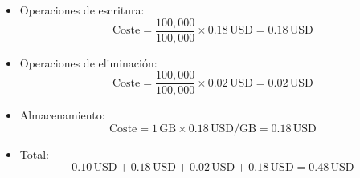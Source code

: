 \begin{enumerate}
\begin{enumerate}
\begin{itemize}
\begin{itemize}
							\item Operaciones de escritura:
								\[
									\text{Coste}= \frac{100,000}{100,000}\times 0.18 \, \text{USD}=
									0.18 \, \text{USD}
								\]

							\item Operaciones de eliminación:
								\[
									\text{Coste}= \frac{100,000}{100,000}\times 0.02 \, \text{USD}=
									0.02 \, \text{USD}
								\]

							\item Almacenamiento:
								\[
									\text{Coste}= 1 \, \text{GB}\times 0.18 \, \text{USD/GB}= 0.18
									\, \text{USD}
								\]

							\item Total:
								\[
									0.10 \, \text{USD}+ 0.18 \, \text{USD}+ 0.02 \, \text{USD}+ 0.1
									8 \, \text{USD}= 0.48 \, \text{USD}
								\]
						\end{itemize}
				\end{itemize}
		\end{enumerate}


\end{enumerate}
